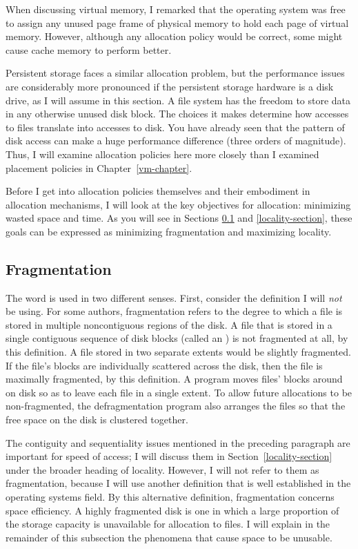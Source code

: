 When discussing virtual memory, I remarked that the operating system
was free to assign any unused page frame of physical memory to hold
each page of virtual memory.  However, although any allocation policy
would be correct, some might cause cache memory to perform better.

Persistent storage faces a similar allocation problem, but the
performance issues are considerably more pronounced if the persistent
storage hardware is a disk drive, as I will assume in this section.  A file system
has the freedom to store data in any
otherwise unused disk block.  The choices it makes determine how
accesses to files translate into accesses to disk.  You have already seen
that the pattern of disk access can make a huge performance difference
(three orders of magnitude).  Thus, I will examine allocation
policies here more closely than I examined placement policies in
Chapter~\ref{vm-chapter}.

Before I get into allocation policies themselves and their
embodiment in allocation mechanisms, I will
look at the key objectives for allocation: minimizing wasted space
and time.  As you will see in Sections \ref{fragmentation-section} and
\ref{locality-section}, these goals can be
expressed as minimizing fragmentation and maximizing locality.

\subsection{Fragmentation}\label{fragmentation-section}

The word  is used in two different senses.
First, consider the definition I will \emph{not} be using.  For
some authors, fragmentation refers to the degree to which a file is
stored in multiple noncontiguous regions of the disk.  A file that is
stored in a single contiguous sequence of disk blocks (called an
) is not fragmented at all, by this definition.
A file stored in two separate extents would be
slightly fragmented.  If the file's blocks are individually scattered
across the disk, then the file is maximally fragmented, by this
definition.  A
 program moves files' blocks around on disk so
as to leave each file in a single extent.  To allow future allocations
to be non-fragmented, the defragmentation program also arranges the
files so that the free space on the disk is clustered together.

The contiguity and sequentiality issues mentioned in the preceding
paragraph are important for speed of access; I will discuss them in
Section~\ref{locality-section} under the broader heading of locality.  However,
I will not refer to them as fragmentation, because I will use
another definition that is well established in the
operating systems field.  By this alternative definition,
fragmentation concerns space efficiency.  A highly fragmented disk is
one in which a large proportion of the storage capacity is unavailable
for allocation to files.  I will explain in the remainder of this
subsection the phenomena that cause space to be unusable.

